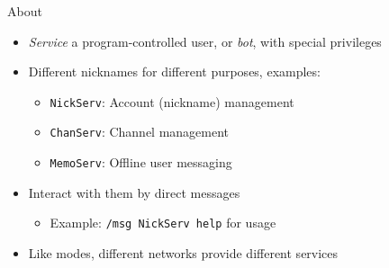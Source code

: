 \documentclass{beamer}
\begin{document}
\begin{frame}{About}
\begin{itemize}
	\item \emph{Service} a program-controlled user, or \emph{bot}, with special privileges
	\item Different nicknames for different purposes, examples:
	\begin{itemize}
		\item \texttt{NickServ}: Account (nickname) management
		\item \texttt{ChanServ}: Channel management
		\item \texttt{MemoServ}: Offline user messaging
	\end{itemize}
	\item Interact with them by direct messages
	\begin{itemize}
		\item Example: \texttt{/msg NickServ help} for usage
	\end{itemize}
	\item Like modes, different networks provide different services
\end{itemize}
\end{frame}
\end{document}
